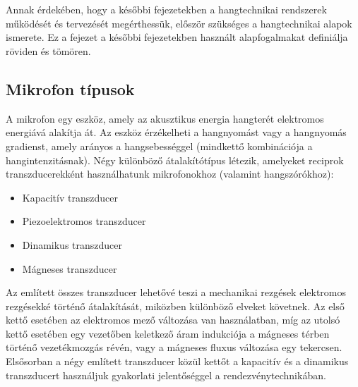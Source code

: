 \chapter{\AudioBasics}

Annak érdekében, hogy a későbbi fejezetekben a hangtechnikai rendszerek működését és tervezését megérthessük,
először szükséges a hangtechnikai alapok ismerete. Ez a fejezet a későbbi fejezetekben használt alapfogalmakat definiálja röviden és tömören.

\section{Mikrofon típusok}

A mikrofon egy eszköz, amely az akusztikus energia hangterét elektromos energiává alakítja át.
Az eszköz érzékelheti a hangnyomást vagy a hangnyomás gradienst, amely arányos a hangsebességgel (mindkettő kombinációja a hangintenzitásnak).
Négy különböző átalakítótípus létezik, amelyeket reciprok transzducerekként használhatunk mikrofonokhoz (valamint hangszórókhoz):

\begin{itemize}
    \item Kapacitív transzducer
    \item Piezoelektromos transzducer
    \item Dinamikus transzducer
    \item Mágneses transzducer
\end{itemize}

Az említett összes transzducer lehetővé teszi a mechanikai rezgések elektromos rezgésekké történő átalakítását,
miközben különböző elveket követnek. Az első kettő esetében az elektromos mező változása
van használatban, míg az utolsó kettő esetében egy vezetőben keletkező áram indukciója a mágneses térben történő vezetékmozgás révén,
vagy a mágneses fluxus változása egy tekercsen. 
Elsősorban a négy említett transzducer közül kettőt a kapacitív és a dinamikus transzducert
használjuk gyakorlati jelentőséggel a rendezvénytechnikában.

